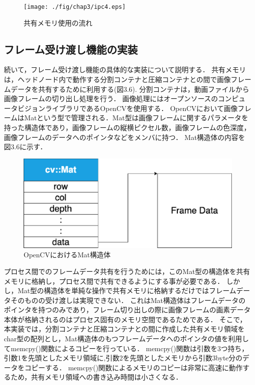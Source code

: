 \begin{figure}[H]
    \hspace*{\fill}
    \texttt{[image: ./fig/chap3/ipc4.eps]}
    \hspace*{\fill}
    \caption{共有メモリ使用の流れ}
\end{figure}

\subsection*{フレーム受け渡し機能の実装}

続いて，フレーム受け渡し機能の具体的な実装について説明する．
共有メモリは，ヘッドノード内で動作する分割コンテナと圧縮コンテナとの間で画像フレームデータを共有するために利用する(図3.6).
分割コンテナは，動画ファイルから画像フレームの切り出し処理を行う．
画像処理にはオープンソースのコンピュータビジョンライブラリであるOpenCVを使用する．
OpenCVにおいて画像フレームはMatという型で管理される．Mat型は画像フレームに関するパラメータを持った構造体であり，画像フレームの縦横ピクセル数，画像フレームの色深度，画像フレームのデータへのポインタなどをメンバに持つ．
Mat構造体の内容を図3.6に示す．

\begin{figure}[H]
    \hspace*{\fill}
    \includegraphics[width=\linewidth]{./fig/chap3/mat.eps}
    \hspace*{\fill}
    \caption{OpenCVにおけるMat構造体}
\end{figure}

プロセス間でのフレームデータ共有を行うためには，このMat型の構造体を共有メモリに格納し，プロセス間で共有できるようにする事が必要である．
しかし，Mat型の構造体を単純な操作で共有メモリに格納するだけではフレームデータそのものの受け渡しは実現できない．
これはMat構造体はフレームデータのポインタを持つのみであり，フレーム切り出しの際に画像フレームの画素データ本体が格納されるのはプロセス固有のメモリ空間であるためである．
そこで，本実装では，分割コンテナと圧縮コンテナとの間に作成した共有メモリ領域をchar型の配列とし，Mat構造体のもつフレームデータへのポインタの値を利用してmemcpy()関数によるコピーを行っている．
memcpy()関数は引数を3つ持ち，引数1を先頭としたメモリ領域に,引数2を先頭としたメモリから引数3byte分のデータをコピーする．
memcpy()関数によるメモリのコピーは非常に高速に動作するため，共有メモリ領域への書き込み時間は小さくなる．

